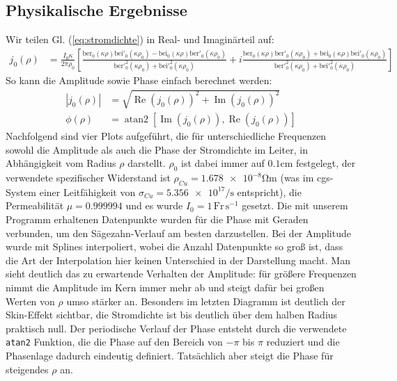 \documentclass[10pt,a4paper]{article}
\begin{document}
\subsection{Physikalische Ergebnisse}
\label{ssec:physikalischeergebnisse}
Wir teilen Gl. (\ref{eq:stromdichte}) in Real- und Imaginärteil auf:
\begin{align}
	j_0(\rho) &= \frac{I_0 \kappa}{2 \pi \rho_0} \left[ \frac{\mathrm{ber}_0(\kappa \rho)\mathrm{bei}'_0(\kappa \rho_0) - \mathrm{bei}_0(\kappa \rho)\mathrm{ber}'_0(\kappa \rho_0)}{\mathrm{ber}'^2_0(\kappa \rho_0)+\mathrm{bei}'^2_0(\kappa \rho_0)} + i\frac{\mathrm{ber}_0(\kappa \rho)\mathrm{ber}'_0(\kappa \rho_0) + \mathrm{bei}_0(\kappa \rho)\mathrm{bei}'_0(\kappa \rho_0)}{\mathrm{ber}'^2_0(\kappa \rho_0)+\mathrm{bei}'^2_0(\kappa \rho_0)}\right]
\end{align}
So kann die Amplitude sowie Phase einfach berechnet werden:
\begin{align}
	|j_0(\rho)| &= \sqrt{\operatorname{Re}(j_0(\rho))^2 + \operatorname{Im}(j_0(\rho))^2}\\
	\phi(\rho) &= \operatorname{atan2}\left[\operatorname{Im}(j_0(\rho)), \operatorname{Re}(j_0(\rho))\right]
\end{align}
Nachfolgend sind vier Plots aufgeführt, die für unterschiedliche Frequenzen sowohl die Amplitude als auch die Phase der Stromdichte im Leiter, in Abhängigkeit vom Radius $\rho$ darstellt. $\rho_0$ ist dabei immer auf $\num{0.1} \si{\centi\metre}$ festgelegt, der verwendete spezifischer Widerstand ist $\rho_{Cu} = \num{1.678e-8} \si{\ohm\metre}$ \cite{crchandbook} (was im cgs-System einer Leitfähigkeit von $\sigma_{Cu} = \num{5.356e17} \si{\per\second}$ entspricht), die Permeabilität $\mu = \num{0.999994}$ \cite{crchandbook} und es wurde $I_0 = \num{1} \, \mathrm{Fr}\,\mathrm{s}^{-1}$ gesetzt. Die mit unserem Programm erhaltenen Datenpunkte wurden für die Phase mit Geraden verbunden, um den Sägezahn-Verlauf am besten darzustellen. Bei der Amplitude wurde mit Splines interpoliert, wobei die Anzahl Datenpunkte so groß ist, dass die Art der Interpolation hier keinen Unterschied in der Darstellung macht. Man sieht deutlich das zu erwartende Verhalten der Amplitude: für größere Frequenzen nimmt die Amplitude im Kern immer mehr ab und steigt dafür bei großen Werten von $\rho$ umso stärker an. Besonders im letzten Diagramm ist deutlich der Skin-Effekt sichtbar, die Stromdichte ist bis deutlich über dem halben Radius praktisch null. Der periodische Verlauf der Phase entsteht durch die verwendete \texttt{atan2} Funktion, die die Phase auf den Bereich von $-\pi$ bis $\pi$ reduziert und die Phasenlage dadurch eindeutig definiert. Tatsächlich aber steigt die Phase für steigendes $\rho$ an.
\end{document}

